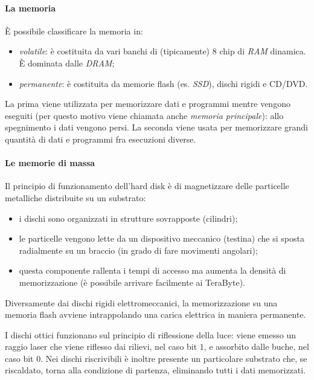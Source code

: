 \documentclass[class=book, crop=false, oneside]{standalone}
\begin{document}
\paragraph*{La memoria}
\`{E} possibile classificare la memoria in:
\begin{itemize}
	\item \emph{volatile}: è costituita da vari banchi di (tipicamente) \(8\) chip di \emph{RAM} dinamica. \`{E} dominata dalle \emph{DRAM};
	\item \emph{permanente}: è costituita da memorie flash (es. \emph{SSD}), dischi rigidi e CD/DVD.
\end{itemize}
La prima viene utilizzata per memorizzare dati e programmi mentre vengono eseguiti (per questo motivo viene chiamata anche \emph{memoria principale}): allo spegnimento i dati vengono persi.
La seconda viene usata per memorizzare grandi quantità di dati e programmi fra esecuzioni diverse.

\paragraph{Le memorie di massa}
Il principio di funzionamento dell'hard disk è di magnetizzare delle particelle metalliche distribuite su un substrato:
\begin{itemize}[noitemsep]
	\item i dischi sono organizzati in strutture sovrapposte (cilindri);
	\item le particelle vengono lette da un dispositivo meccanico (testina) che si sposta radialmente su un braccio (in grado di fare movimenti angolari);
	\item questa componente rallenta i tempi di accesso ma aumenta la densità di memorizzazione (è possibile arrivare facilmente ai TeraByte).
\end{itemize}
Diversamente dai dischi rigidi elettromeccanici, la memorizzazione su una memoria flash avviene intrappolando una carica elettrica in maniera permanente.

I dischi ottici funzionano sul principio di riflessione della luce: viene emesso un raggio laser che viene riflesso dai rilievi, nel caso bit \(1\), e assorbito dalle buche, nel caso bit \(0\).
Nei dischi riscrivibili è inoltre presente un particolare substrato che, se riscaldato, torna alla condizione di partenza, eliminando tutti i dati memorizzati.
\end{document}
